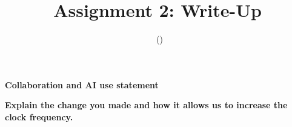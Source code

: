 \documentclass[11pt]{article}
\title{Assignment 2: Write-Up}
\author{\studentname\ (\netid)}
\date{}
\newcommand{\prompt}[1]{\par\medskip\noindent\textbf{#1}\par\smallskip\noindent\ignorespaces}
\begin{document}
\maketitle

\begin{center}
  \textbf{Collaboration and AI use statement}
\end{center}
\noindent{}

\clearpage

\prompt{Explain the change you made and how it allows us to increase the clock frequency.}
%
%
%
\end{document}
